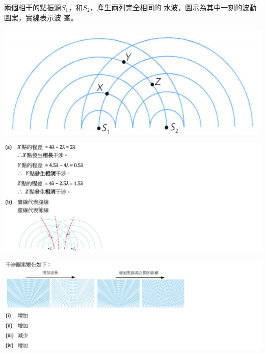 {
    兩個相干的點振源$S_1$，和$S_2$，產生兩列完全相同的 水波，圖示為其中一刻的波動圖案，實線表示波 峯。
    \par{\par\centering\includegraphics[width=.4\textwidth]{./img/ch3_earlyclass_wave_lq_2024-05-14-11-39-43.png}\par}

}{
    \sol
    \par{\par\centering\includegraphics[width=\textwidth]{./img/ch3_earlyclass_wave_lq_2024-05-14-11-45-50.png}\par}
    \par{\par\centering\includegraphics[width=\textwidth]{./img/ch3_earlyclass_wave_lq_2024-05-14-11-46-27.png}\par}
}

